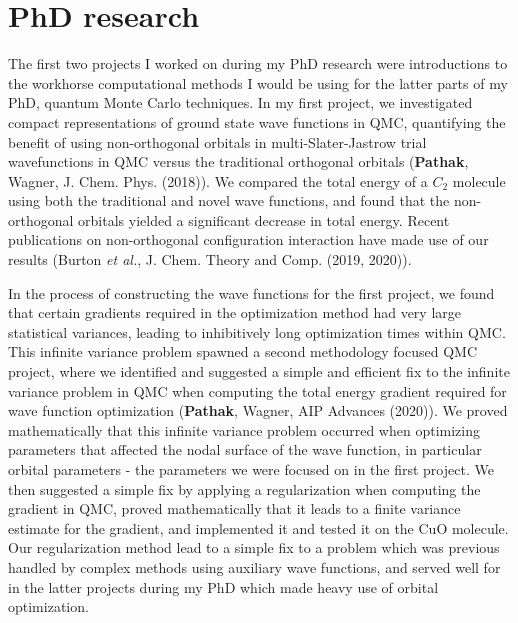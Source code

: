 \documentclass{article}
\begin{document}
\section{PhD research}
The first two projects I worked on during my PhD research were introductions to the workhorse computational methods I would be using for the latter parts of my PhD, quantum Monte Carlo techniques.
In my first project, we investigated compact representations of ground state wave functions in QMC,  quantifying the benefit of using non-orthogonal orbitals in multi-Slater-Jastrow trial wavefunctions in QMC versus the traditional orthogonal orbitals (\textbf{Pathak}, Wagner,  J. Chem. Phys.  (2018)).
We compared the total energy of a $C_2$ molecule using both the traditional and novel wave functions, and found that the non-orthogonal orbitals yielded a significant decrease in total energy.
Recent publications on non-orthogonal configuration interaction have made use of our results (Burton \textit{et al.}, J. Chem. Theory and Comp. (2019, 2020)).

In the process of constructing the wave functions for the first project, we found that certain gradients required in the optimization method had very large statistical variances,  leading to inhibitively long optimization times within QMC.
This infinite variance problem spawned a second methodology focused QMC project, where we identified and suggested a simple and efficient fix to the infinite variance problem in QMC when computing the total energy gradient required for wave function optimization (\textbf{Pathak}, Wagner, AIP Advances (2020)).
We proved mathematically that this infinite variance problem occurred when optimizing parameters that affected the nodal surface of the wave function, in particular orbital parameters - the parameters we were focused on in the first project.
We then suggested a simple fix by applying a regularization when computing the gradient in QMC,  proved mathematically that it leads to a finite variance estimate for the gradient, and implemented it and tested it on the CuO molecule.
Our regularization method lead to a simple fix to a problem which was previous handled by complex methods using auxiliary wave functions, and served well for in the latter projects during my PhD which made heavy use of orbital optimization.
\end{document}
